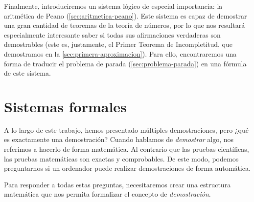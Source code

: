 Finalmente, introduciremos un sistema lógico de especial importancia: la aritmética de Peano (\cref{sec:aritmetica-peano}). Este sistema es capaz de demostrar una gran cantidad de teoremas de la teoría de números, por lo que nos resultará especialmente interesante saber si todas sus afirmaciones verdaderas son demostrables (este es, justamente, el Primer Teorema de Incompletitud, que demostramos en la \cref{sec:primera-aproximacion}). Para ello, encontraremos una forma de traducir el problema de parada (\cref{sec:problema-parada}) en una fórmula de este sistema.


\section{Sistemas formales}\label{sec:sistemas-formales}

A lo largo de este trabajo, hemos presentado múltiples demostraciones, pero ¿qué es exactamente una demostración? Cuando hablamos de \emph{demostrar} algo, nos referimos a hacerlo de forma matemática. Al contrario que las pruebas científicas, las pruebas matemáticas son exactas y comprobables. De este modo, podemos preguntarnos si un ordenador puede realizar demostraciones de forma automática.

Para responder a todas estas preguntas, necesitaremos crear una estructura matemática que nos permita formalizar el concepto de \emph{demostración}.

